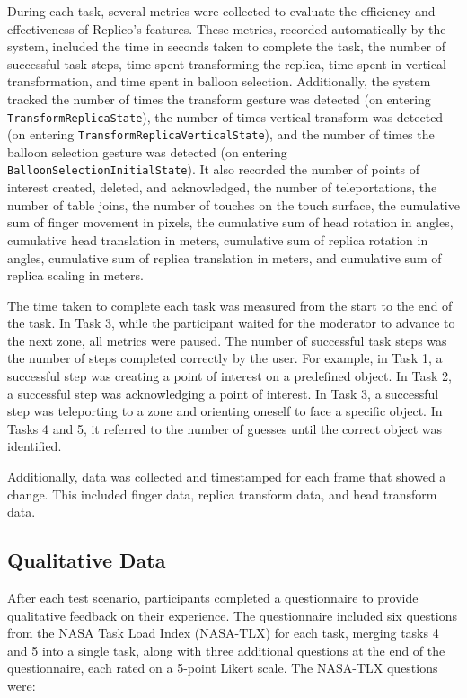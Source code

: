         During each task, several metrics were collected to evaluate the efficiency and effectiveness of Replico's features. These metrics, recorded automatically by the system, included the time in seconds taken to complete the task, the number of successful task steps, time spent transforming the replica, time spent in vertical transformation, and time spent in balloon selection. Additionally, the system tracked the number of times the transform gesture was detected (on entering \lstinline{TransformReplicaState}), the number of times vertical transform was detected (on entering \lstinline{TransformReplicaVerticalState}), and the number of times the balloon selection gesture was detected (on entering \lstinline{BalloonSelectionInitialState}). It also recorded the number of points of interest created, deleted, and acknowledged, the number of teleportations, the number of table joins, the number of touches on the touch surface, the cumulative sum of finger movement in pixels, the cumulative sum of head rotation in angles, cumulative head translation in meters, cumulative sum of replica rotation in angles, cumulative sum of replica translation in meters, and cumulative sum of replica scaling in meters.

        The time taken to complete each task was measured from the start to the end of the task. In Task 3, while the participant waited for the moderator to advance to the next zone, all metrics were paused. The number of successful task steps was the number of steps completed correctly by the user. For example, in Task 1, a successful step was creating a point of interest on a predefined object. In Task 2, a successful step was acknowledging a point of interest. In Task 3, a successful step was teleporting to a zone and orienting oneself to face a specific object. In Tasks 4 and 5, it referred to the number of guesses until the correct object was identified.

        Additionally, data was collected and timestamped for each frame that showed a change. This included finger data, replica transform data, and head transform data.
    
    \subsection{Qualitative Data} \label{sec:qualitative_data}

        After each test scenario, participants completed a questionnaire to provide qualitative feedback on their experience. The questionnaire included six questions from the NASA Task Load Index (NASA-TLX) \cite{hart1988development} for each task, merging tasks 4 and 5 into a single task, along with three additional questions at the end of the questionnaire, each rated on a 5-point Likert scale. The NASA-TLX questions were:

